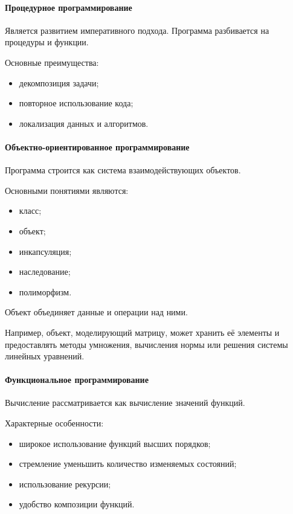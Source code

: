 \paragraph{Процедурное программирование}

Является развитием императивного подхода. Программа разбивается на процедуры и функции.

Основные преимущества:
\begin{itemize}
	\item декомпозиция задачи;
	\item повторное использование кода;
	\item локализация данных и алгоритмов.
\end{itemize}

\paragraph{Объектно-ориентированное программирование}

Программа строится как система взаимодействующих объектов.

Основными понятиями являются:
\begin{itemize}
	\item класс;
	\item объект;
	\item инкапсуляция;
	\item наследование;
	\item полиморфизм.
\end{itemize}

Объект объединяет данные и операции над ними.

Например, объект, моделирующий матрицу, может хранить её элементы и предоставлять методы умножения, вычисления нормы или решения системы линейных уравнений.

\paragraph{Функциональное программирование}

Вычисление рассматривается как вычисление значений функций.

Характерные особенности:
\begin{itemize}
	\item широкое использование функций высших порядков;
	\item стремление уменьшить количество изменяемых состояний;
	\item использование рекурсии;
	\item удобство композиции функций.
\end{itemize}

